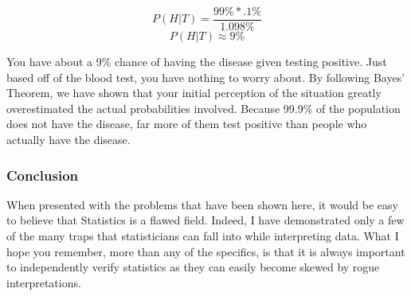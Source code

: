 \[P(H|T) = \frac{99\% * .1\%}{1.098\%}\]
\[P(H|T) \approx 9\% \]

You have about a 9\% chance of having the disease given testing positive. Just based off of the blood test, you have nothing to worry about. By following Bayes’ Theorem, we have shown that your initial perception of the situation greatly overestimated the actual probabilities involved. Because 99.9\% of the population does not have the disease, far more of them test positive than people who actually have the disease.

\subsubsection*{Conclusion}

When presented with the problems that have been shown here, it would be easy to believe that Statistics is a flawed field. Indeed, I have demonstrated only a few of the many traps that statisticians can fall into while interpreting data. What I hope you remember, more than any of the specifics, is that it is always important to independently verify statistics as they can easily become skewed by rogue interpretations.
